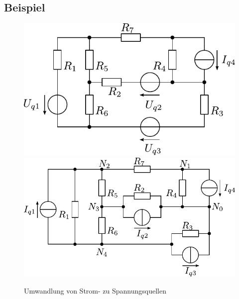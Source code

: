 \newpage
\subsection{Beispiel}

\begin{figure}[h!]
\centering
\includegraphics[scale=\schscale]{knotpot_sch.pdf}
\includegraphics[scale=\schscale]{knotpot_sch_2.pdf}
\caption{Umwandlung von Strom- zu Spannungsquellen}
\label{sch:knotpot_2}
\end{figure}

